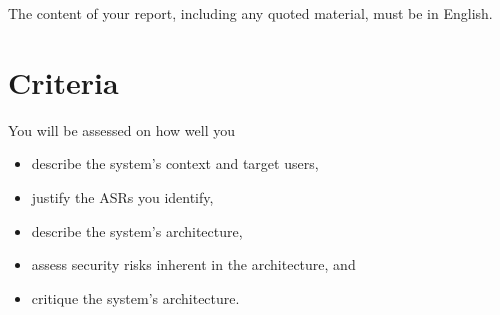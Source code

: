 \documentclass{csse4400}
\begin{document}
The content of your report, including any quoted material, must be in English.

%
%
%


\section{Criteria}
You will be assessed on how well you
\begin{itemize}%
    \item describe the system's context and target users,
    \item justify the ASRs you identify,
    \item describe the system's architecture,
    \item assess security risks inherent in the architecture, and
    \item critique the system's architecture.
\end{itemize}
\end{document}
